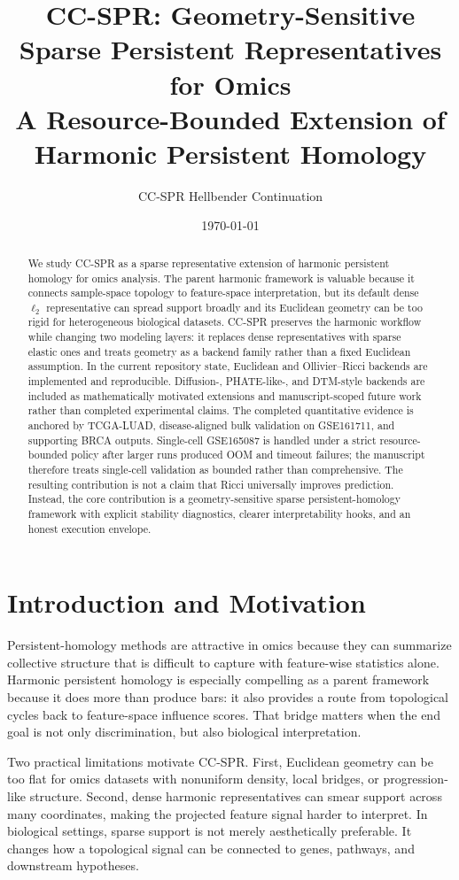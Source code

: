 \documentclass[11pt]{article}
\title{CC-SPR: Geometry-Sensitive Sparse Persistent Representatives for Omics\\
\large A Resource-Bounded Extension of Harmonic Persistent Homology}
\author{CC-SPR Hellbender Continuation}
\date{\today}
\begin{document}
\maketitle

\begin{abstract}
We study CC-SPR as a sparse representative extension of harmonic persistent homology for omics analysis. The parent harmonic framework is valuable because it connects sample-space topology to feature-space interpretation, but its default dense $\ell_2$ representative can spread support broadly and its Euclidean geometry can be too rigid for heterogeneous biological datasets. CC-SPR preserves the harmonic workflow while changing two modeling layers: it replaces dense representatives with sparse elastic ones and treats geometry as a backend family rather than a fixed Euclidean assumption. In the current repository state, Euclidean and Ollivier--Ricci backends are implemented and reproducible. Diffusion-, PHATE-like-, and DTM-style backends are included as mathematically motivated extensions and manuscript-scoped future work rather than completed experimental claims. The completed quantitative evidence is anchored by TCGA-LUAD, disease-aligned bulk validation on GSE161711, and supporting BRCA outputs. Single-cell GSE165087 is handled under a strict resource-bounded policy after larger runs produced OOM and timeout failures; the manuscript therefore treats single-cell validation as bounded rather than comprehensive. The resulting contribution is not a claim that Ricci universally improves prediction. Instead, the core contribution is a geometry-sensitive sparse persistent-homology framework with explicit stability diagnostics, clearer interpretability hooks, and an honest execution envelope.
\end{abstract}

\section{Introduction and Motivation}
Persistent-homology methods are attractive in omics because they can summarize collective structure that is difficult to capture with feature-wise statistics alone. Harmonic persistent homology is especially compelling as a parent framework because it does more than produce bars: it also provides a route from topological cycles back to feature-space influence scores. That bridge matters when the end goal is not only discrimination, but also biological interpretation.

Two practical limitations motivate CC-SPR. First, Euclidean geometry can be too flat for omics datasets with nonuniform density, local bridges, or progression-like structure. Second, dense harmonic representatives can smear support across many coordinates, making the projected feature signal harder to interpret. In biological settings, sparse support is not merely aesthetically preferable. It changes how a topological signal can be connected to genes, pathways, and downstream hypotheses.
\end{document}
